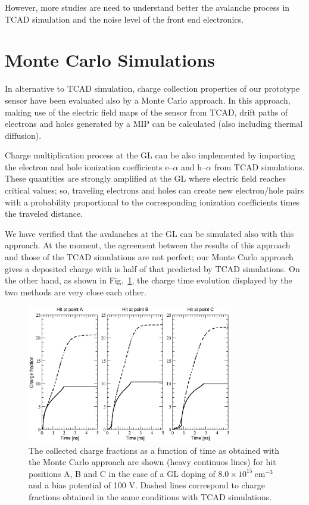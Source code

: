 \documentclass[aps,pt14,superscriptaddress,showpacs,floatfix,nofootinbib]{revtex4}
\begin{document}
However, more studies are need to understand better the avalanche process in TCAD simulation and the noise 
level of the front end electronics.   

\section{Monte Carlo Simulations}

In alternative to TCAD simulation, charge collection properties of our prototype sensor have been evaluated also by a Monte Carlo approach. In this approach, making use of the electric field maps of the sensor from TCAD, drift paths of electrons and holes generated by a MIP can be calculated (also including thermal diffusion). 

Charge multiplication process at the GL can be also implemented by importing the electron and hole ionization coefficients e--$\alpha$ and h--$\alpha$ from TCAD simulations. These quantities are strongly amplified at the GL where electric field reaches critical values; so, traveling electrons and holes can create new electron/hole pairs with a probability proportional to the corresponding ionization coefficients times the traveled distance.    

We have verified that the avalanches at the GL can be simulated also with this approach. At the moment, the agreement between the results of this approach and those of the TCAD simulations are not perfect; our Monte Carlo approach gives a deposited charge with is half of that predicted by TCAD simulations. On the other hand, as shown in Fig.~\ref{fig:NewChargeFraction}, the charge time evolution displayed by the two methods are very close each other. 

\begin{figure}[hbtp]
\begin{center}
\includegraphics[width=0.8\textwidth,keepaspectratio]{figures1/NewChargeFraction.pdf}
\caption{The collected charge fractions as a function of time as obtained with the Monte Carlo approach are shown (heavy continuos lines) for hit positions A, B and C in the case of a GL doping of $8.0\times 10^{15}\ \mathrm{cm^{-3}}$ and a bias potential of 100 V. Dashed lines correspond to charge fractions obtained in the same conditions with TCAD simulations.\label{fig:NewChargeFraction}}
\end{center}
\end{figure}
\end{document}
